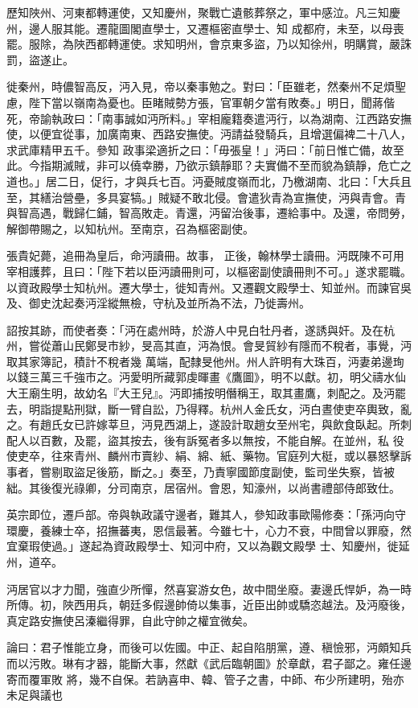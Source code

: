 \begin{pinyinscope}
 歷知陜州、河東都轉運使，又知慶州，聚戰亡遺骸葬祭之，軍中感泣。凡三知慶州，邊人服其能。遷龍圖閣直學士，又遷樞密直學士、知
 成都府，未至，以母喪罷。服除，為陜西都轉運使。求知明州，會京東多盜，乃以知徐州，明購賞，嚴誅罰，盜遂止。



 徙秦州，時儂智高反，沔入見，帝以秦事勉之。對曰：「臣雖老，然秦州不足煩聖慮，陛下當以嶺南為憂也。臣睹賊勢方張，官軍朝夕當有敗奏。」明日，聞蔣偕死，帝諭執政曰：「南事誠如沔所料。」宰相龐籍奏遣沔行，以為湖南、江西路安撫使，以便宜從事，加廣南東、西路安撫使。沔請益發騎兵，且增選偏裨二十八人，求武庫精甲五千。參知
 政事梁適折之曰：「毋張皇！」沔曰：「前日惟亡備，故至此。今指期滅賊，非可以僥幸勝，乃欲示鎮靜耶？夫實備不至而貌為鎮靜，危亡之道也。」居二日，促行，才與兵七百。沔憂賊度嶺而北，乃檄湖南、北曰：「大兵且至，其繕治營壘，多具宴犒。」賊疑不敢北侵。會遣狄青為宣撫使，沔與青會。青與智高遇，戰歸仁鋪，智高敗走。青還，沔留治後事，遷給事中。及還，帝問勞，解御帶賜之，以知杭州。至南京，召為樞密副使。



 張貴妃薨，追冊為皇后，命沔讀冊。故事，
 正後，翰林學士讀冊。沔既陳不可用宰相護葬，且曰：「陛下若以臣沔讀冊則可，以樞密副使讀冊則不可。」遂求罷職。以資政殿學士知杭州。遷大學士，徙知青州。又遷觀文殿學士、知並州。而諫官吳及、御史沈起奏沔淫縱無檢，守杭及並所為不法，乃徙壽州。



 詔按其跡，而使者奏：「沔在處州時，於游人中見白牡丹者，遂誘與奸。及在杭州，嘗從蕭山民鄭旻市紗，旻高其直，沔為恨。會旻貿紗有隱而不稅者，事覺，沔取其家簿記，積計不稅者幾
 萬端，配隸旻他州。州人許明有大珠百，沔妻弟邊珣以錢三萬三千強市之。沔愛明所藏郭虔暉畫《鷹圖》，明不以獻。初，明父禱水仙大王廟生明，故幼名『大王兒』。沔即捕按明僭稱王，取其畫鷹，刺配之。及沔罷去，明詣提點刑獄，斷一臂自訟，乃得釋。杭州人金氏女，沔白晝使吏卒輿致，亂之。有趙氏女已許嫁莘旦，沔見西湖上，遂設計取趙女至州宅，與飲食臥起。所刺配人以百數，及罷，盜其按去，後有訴冤者多以無按，不能自解。在並州，私
 役使吏卒，往來青州、麟州市賣紗、絹、綿、紙、藥物。官庭列大梃，或以暴怒擊訴事者，嘗剔取盜足後筋，斷之。」奏至，乃責寧國節度副使，監司坐失察，皆被絀。其後復光祿卿，分司南京，居宿州。會恩，知濠州，以尚書禮部侍郎致仕。



 英宗即位，遷戶部。帝與執政議守邊者，難其人，參知政事歐陽修奏：「孫沔向守環慶，養練士卒，招撫蕃夷，恩信最著。今雖七十，心力不衰，中間曾以罪廢，然宜棄瑕使過。」遂起為資政殿學士、知河中府，又以為觀文殿學
 士、知慶州，徙延州，道卒。



 沔居官以才力聞，強直少所憚，然喜宴游女色，故中間坐廢。妻邊氏悍妒，為一時所傳。初，陜西用兵，朝廷多假邊帥倚以集事，近臣出帥或驕恣越法。及沔廢後，真定路安撫使呂溱繼得罪，自此守帥之權宜微矣。



 論曰：君子惟能立身，而後可以佐國。中正、起自陷朋黨，遵、稹憸邪，沔頗知兵而以污敗。琳有才器，能斷大事，然獻《武后臨朝圖》於章獻，君子鄙之。雍任邊寄而覆軍敗
 將，幾不自保。若訥喜申、韓、管子之書，中師、布少所建明，殆亦未足與議也



\end{pinyinscope}